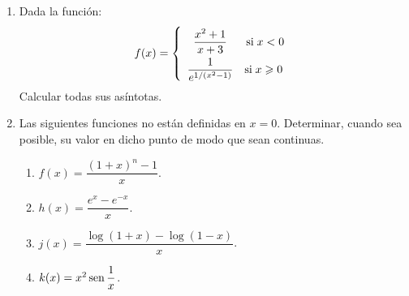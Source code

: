 \begin{enumerate}[leftmargin=*]
\item Dada la función:
      \[
      \renewcommand{\arraystretch}{2}
      f(x) = \left\{
      \begin{array}{*{20}c}{
      \dfrac{{x^2  + 1}}{{x + 3}}}     & {\text{si}\;x < 0}           \\
      {\dfrac{1}{{e^{1/(x^2  - 1)} }}} & {\text{si}\;x \geqslant 0\;} \\
      \end{array}
      \right.
      \]
      Calcular todas sus asíntotas.

\item  Las siguientes funciones no están definidas en $x=0$.
      Determinar, cuando sea posible, su valor en dicho punto de modo que sean continuas.
      \begin{multicols}{2}
      \begin{enumerate}
      \item  $f(x)=\dfrac{(1+x)^n-1}{x}$.
      \item  $h(x)=\dfrac{e^x-e^{-x}}{x}$.
      \item  $j(x)=\dfrac{\log(1+x)-\log(1-x)}{x}$.
      \item  $k(x)=x^2\operatorname{sen}\dfrac{1}{x}$.
      \end{enumerate}
      \end{multicols}

\end{enumerate}
